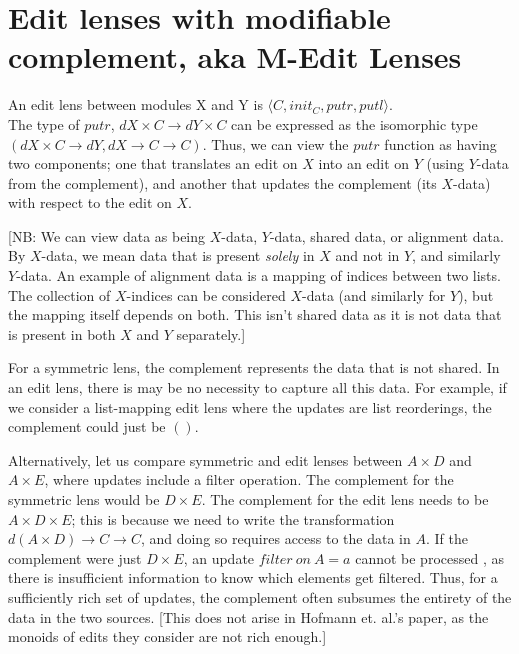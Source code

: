\documentclass[a4paper,10pt]{article}
\title{}
\author{}
\begin{document}
\maketitle

\section{Edit lenses with modifiable complement, aka M-Edit Lenses}
An edit lens between modules X and Y is $\langle C, init_C, putr, putl \rangle$. \\
The type of $putr$, $dX \times C \to dY \times C$ can be expressed as the isomorphic type $(dX \times C \to dY, dX \to C \to C)$. Thus, we can view the $putr$ function as having two components; one that translates an edit on $X$ into an edit on $Y$ (using $Y$-data from the complement), and another that updates the complement (its $X$-data) with respect to the edit on $X$.

[NB: We can view data as being $X$-data, $Y$-data, shared data, or alignment data. By $X$-data, we mean data that is present \emph{solely} in $X$ and not in $Y$, and similarly $Y$-data. An example of alignment data is a mapping of indices between two lists. The collection of $X$-indices can be considered $X$-data (and similarly for $Y$), but the mapping itself depends on both. This isn't shared data as it is not data that is present in both $X$ and $Y$ separately.]

For a symmetric lens, the complement represents the data that is not shared. In an edit lens, there is may be no necessity to capture all this data. For example, if we consider a list-mapping edit lens where the updates are list reorderings, the complement could just be $()$. 

Alternatively, let us compare symmetric and edit lenses between $A \times D$ and $A \times E$, where updates include a filter operation. The complement for the symmetric lens would be $D \times E$. 
The complement for the edit lens needs to be $A \times D \times E$; this is because we need to write the transformation $d(A \times D) \to C \to C$, and doing so requires access to the data in $A$. If the complement were just $D \times E$, an update $filter~on~A=a$ cannot be processed , as there is insufficient information to know which elements get filtered.
Thus, for a sufficiently rich set of updates, the complement often subsumes the entirety of the data in the two sources.
[This does not arise in Hofmann et. al.'s paper, as the monoids of edits they consider are not rich enough.]
\end{document}
